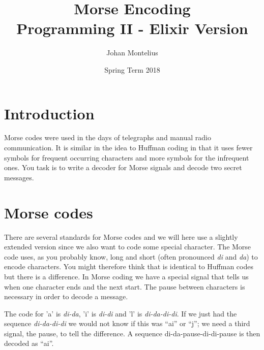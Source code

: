 \documentclass[a4paper,11pt]{article}
\begin{document}

\title{
    \textbf{Morse Encoding}\\
    \large{Programming II - Elixir Version}
}
\author{Johan Montelius}
\date{Spring Term 2018}
\maketitle
\thispagestyle{fancy}



\section*{Introduction}

Morse codes were used in the days of telegraphs and manual radio
communication. It is similar in the idea to Huffman coding in that it
uses fewer symbols for frequent occurring characters and more symbols
for the infrequent ones. You task is to write a decoder for Morse
signals and decode two secret messages.   



\section{Morse codes}

There are several standards for Morse codes and we will here use a
slightly extended version since we also want to code some special
character. The Morse code uses, as you probably know, long and short
(often pronounced {\em di} and {\em da}) to encode characters. You
might therefore think that is identical to Huffman codes but there is
a difference. In Morse coding we have a special signal that tells us
when one character ends and the next start. The pause between
characters is necessary in order to decode a message.

The code for 'a' is {\em di-da}, 'i' is {\em di-di} and 'l' is {\em di-da-di-di}.  If
we just had the sequence {\em di-da-di-di} we would not know if this
was ``ai'' or ``j''; we need a third signal, the pause, to tell the
difference. A sequence {di-da-pause-di-di-pause} is then decoded as ``ai''.
\end{document}
